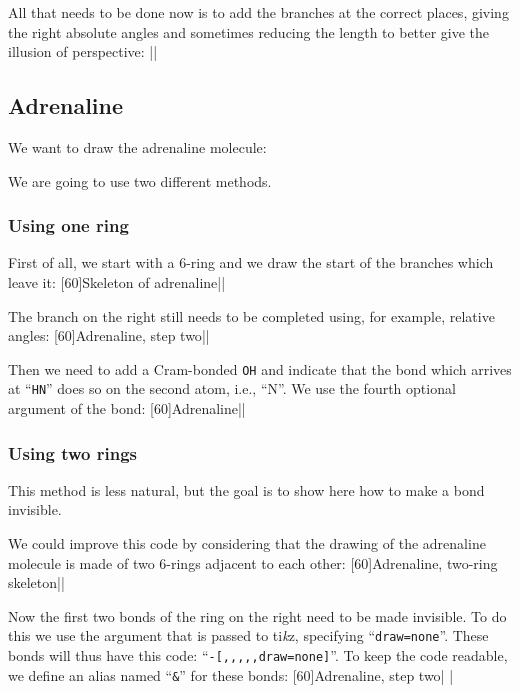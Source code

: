 \documentclass[10pt]{article}
\makeatletter
\newcommand\make@car@active[1]{%
	\catcode`#1\active
	\begingroup
		\lccode`\~`#1\relax
		\lowercase{\endgroup\def~}%
}
\newif\if@exstar
\newcommand\exemple{%
	\begingroup
	\parskip\z@
	\@makeother\;\@makeother\!\@makeother\?\@makeother\:%
	\@ifstar{\@exstartrue\exemple@}{\@exstarfalse\exemple@}}
\newcommand\exemple@[2][65]{%
	\medbreak\noindent
	\begingroup
		\let\do\@makeother\dospecials
		\make@car@active\ { {}}%
		\make@car@active\^^M{\par\leavevmode}%
		\make@car@active\^^I{\space\space}%
		\make@car@active\,{\leavevmode\kern\z@\string,}%
		\make@car@active\-{\leavevmode\kern\z@\string-}%
		\make@car@active\>{\leavevmode\kern\z@\string>}%
		\make@car@active\<{\leavevmode\kern\z@\string<}%
		\exemple@@{#1}{#2}%
}
\newcommand\exemple@@[3]{%
	\def\@tempa##1#3{\exemple@@@{#1}{#2}{##1}}%
	\@tempa
}
\newcommand\exemple@@@[3]{%
	\xdef\the@code{#3}%
	\endgroup
	\if@exstar
		\begingroup
			\fboxrule0.4pt
			\let\breakboxparindent\z@
			\def\bkvz@bottom{\hrule\@height\fboxrule}%
			\let\bkvz@before@breakbox\relax
			\def\bkvz@set@linewidth{\advance\linewidth\dimexpr-2\fboxrule-2\fboxsep}%
			\def\bkvz@left{\vrule\@width\fboxrule\hskip\fboxsep}%
			\def\bkvz@right{\hskip\fboxsep\vrule\@width\fboxrule}%
			\def\bkvz@top{\hbox to \hsize{%
				\vrule\@width\fboxrule\@height\fboxrule
				\leaders\bkvz@bottom\hfill
				\sffamily
				\fboxsep\z@
				\colorbox{black}{\kern0.25em\color{white}\footnotesize\lower0.5ex\hbox{\strut#2}\kern0.25em}%
				\leaders\bkvz@bottom\hfill
				\vrule\@width\fboxrule\@height\fboxrule}}%
			\breakbox
				\kern.5ex\relax
				\ttfamily\footnotesize\the@code\par
				\normalfont
				\kern3pt
				\hrule height0.1pt width\linewidth depth0.1pt
				\vskip5pt
				\rightskip0pt plus 1fill
				\everypar{{\color{lightgray}\rlap{\vrule height0.1pt width\linewidth depth0.1pt}}\hskip0pt plus 1fill}%
				\newlinechar`\^^M\everyeof{\noexpand}\scantokens{#3}\par
			\endbreakbox
		\endgroup
	\else
		\vskip0.5ex
		\boxput*(0,1)
			{\fboxsep\z@
			\hbox{\sffamily\colorbox{black}{\leavevmode\kern0.25em{\color{white}\footnotesize\strut#2}\kern0.25em}}%
			}%
			{\fboxsep5pt
			\fbox{%
				$\vcenter{\hsize\dimexpr0.#1\linewidth-\fboxsep-\fboxrule\relax
					\kern5pt\parskip0pt \ttfamily\footnotesize\the@code}%
				\vcenter{\kern5pt\hsize\dimexpr\linewidth-0.#1\linewidth-\fboxsep-\fboxrule\relax
					\everypar{{\color{lightgray}\rlap{\vrule height0.1pt width\dimexpr\linewidth-0.#1\linewidth-\fboxsep-\fboxrule depth0.1pt}}}%
					\footnotesize\newlinechar`\^^M\everyeof{\noexpand}\scantokens{#3}}$%
				}%
			}%
	\fi
	\medbreak
	\endgroup
}
\newcommand\TIKZ{ti\textit kz\xspace}
\makeatother
\begin{document}
All that needs to be done now is to add the branches at the correct places, giving the right absolute angles and sometimes reducing the length to better give the illusion of perspective:
\exemple{Projection de Haworth}||

\subsection{Adrenaline}
We want to draw the adrenaline molecule:

We are going to use two different methods.

\subsubsection{Using one ring}
First of all, we start with a 6-ring and we draw the start of the branches which leave it:
\exemple[60]{Skeleton of adrenaline}||

The branch on the right still needs to be completed using, for example, relative angles:
\exemple[60]{Adrenaline, step two}||

Then we need to add a Cram-bonded \verb-OH- and indicate that the bond which arrives at ``\verb-HN-'' does so on the second atom, i.e., ``N''. We use the fourth optional argument of the bond:
\exemple[60]{Adrenaline}||

\subsubsection{Using two rings}
This method is less natural, but the goal is to show here how to make a bond invisible.

We could improve this code by considering that the drawing of the adrenaline molecule is made of two 6-rings adjacent to each other:
\exemple[60]{Adrenaline, two-ring skeleton}||

Now the first two bonds of the ring on the right need to be made invisible. To do this we use the argument that is passed to \TIKZ, specifying ``\verb-draw=none-''. These bonds will thus have this code: ``\verb/-[,,,,,draw=none]/''. To keep the code readable, we define an alias named ``\verb-&-'' for these bonds:
\exemple[60]{Adrenaline, step two}|
|
\end{document}
